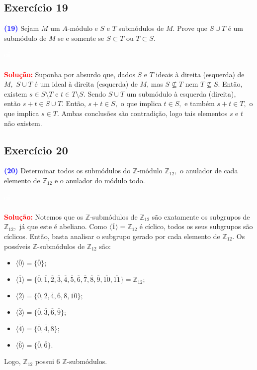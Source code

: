 \documentclass[11pt,a4paper]{article}
\newcommand{\exercicio}[1]{\subsection{Exercício #1} \textcolor{blue}{\bf(#1)}}
\newcommand{\solucao}[1]{
\textbf{\textcolor{white}{oi}\\ \\ \textcolor{red}{Solução:}} #1}
\begin{document}
\exercicio{19}  Sejam $M$ um $A$-módulo e $S$ e $T$ submódulos de $M.$ Prove que $S \cup T$ é um submódulo de $M$ se e somente se $S \subset T$ ou $T \subset S.$ 
\solucao{Suponha por absurdo que, dados $S$ e $T$ ideais à direita (esquerda) de $M,$ $S \cup T$ é um ideal à direita (esquerda) de $M$, mas $S \nsubseteq T$ nem $T \nsubseteq S.$ Então, existem $s \in S \setminus T$ e $t \in T \setminus S.$ Sendo $S \cup T$ um submódulo à esquerda (direita), então $s+t \in S \cup T.$ Então, $s+t \in S,$ o que implica $t \in S,$ e também $s+t \in T,$ o que implica $s \in T.$ Ambas conclusões são contradição, logo tais elementos $s$ e $t$ não existem.}
\exercicio{20} Determinar todos os submódulos do $\mathbb{Z}$-módulo $\mathbb{Z}_{12},$ o anulador de cada elemento de $\mathbb{Z}_{12}$ e o anulador do módulo todo.
\solucao{
Notemos que os $\mathbb{Z}$-submódulos de $\mathbb{Z}_{12}$ são exatamente os subgrupos de $\mathbb{Z}_{12},$ já que este é abeliano. Como $\langle \overline{1} \rangle = \mathbb{Z}_{12}$ é cíclico, todos os seus subgrupos são cíclicos. Então, basta analisar o subgrupo gerado por cada elemento de $\mathbb{Z}_{12}.$ Os possíveis $\mathbb{Z}$-submódulos de $\mathbb{Z}_{12}$ são:
\begin{itemize}
    \item $ \langle \overline{0} \rangle = \{ \overline{0} \};$
    \item $ \langle \overline{1} \rangle = \{ \overline{0}, \overline{1}, \overline{2},\overline{3}, \overline{4}, \overline{5}, \overline{6}, \overline{7}, \overline{8}, \overline{9}, \overline{10}, \overline{11}\} = \mathbb{Z}_{12};$
    \item $ \langle \overline{2} \rangle = \{ \overline{0},  \overline{2}, \overline{4},  \overline{6}, \overline{8},  \overline{10}\};$
    \item $ \langle \overline{3} \rangle = \{ \overline{0}, \overline{3}, \overline{6}, \overline{9}\};$
    \item $ \langle \overline{4} \rangle = \{ \overline{0}, \overline{4}, \overline{8}\} ;$
    \item $ \langle \overline{6} \rangle = \{ \overline{0},  \overline{6}\}.$
\end{itemize}

\noindent
Logo, $\mathbb{Z}_{12}$ possui $6$ $\mathbb{Z}$-submódulos.

}
\end{document}
